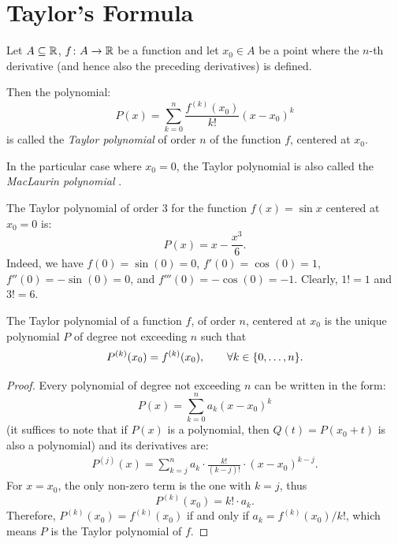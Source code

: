 \section{Taylor's Formula}

\begin{definition}
\mymark{***}
Let $A\subseteq {\mathbb R}$, $f\colon A \to {\mathbb R}$ be a function
and let $x_0\in A$ be a point where the $n$-th derivative
(and hence also the preceding derivatives) is defined.

Then the polynomial:
\[
  P(x) = \sum_{k=0}^n \frac{f^{(k)}(x_0)}{k!}(x-x_0)^k
\]
is called the \emph{Taylor polynomial}%
%
of order $n$
of the function $f$,
centered at $x_0$.
\end{definition}

In the particular case where $x_0=0$, the Taylor polynomial is also called the
\emph{MacLaurin polynomial}%
%
.

\begin{example}
  The Taylor polynomial of order $3$ for the function $f(x) = \sin x$ 
  centered at $x_0=0$ is:
  \[
    P(x) = x - \frac{x^3}{6}.
  \]
  Indeed, we have $f(0) = \sin(0) = 0$, $f'(0) = \cos(0) = 1$, 
  $f''(0) = -\sin(0) = 0$, and $f'''(0) = -\cos(0) = -1$.
  Clearly, $1!=1$ and $3!=6$. 
\end{example}

\begin{theorem}%
\label{th:caratterizzazioneTaylor}%
\mymark{***}%
The Taylor polynomial of a function $f$, of order $n$, centered at $x_0$ is the
unique polynomial $P$ of degree not exceeding $n$ such that
\[
  P^{(k)}(x_0) = f^{(k)}(x_0), \qquad \forall k \in {\left\{ 0,\dots,n \right\}}.
\]
\end{theorem}
%
\begin{proof}
  Every polynomial of degree not exceeding $n$ can be written in the form:
\[
  P(x) = \sum_{k=0}^{n} a_k (x-x_0)^k
\]
(it suffices to note that if $P(x)$ is a polynomial, then $Q(t) = P(x_0+t)$ is
also a polynomial)
and its derivatives are:
\begin{align*}
   P^{(j)}(x)
   = \sum_{k=j}^n a_k \cdot \frac{k!}{(k-j)!}\cdot (x-x_0)^{k-j}.
\end{align*}
For $x=x_0$, the only non-zero term is the one with $k=j$, thus
\[
  P^{(k)}(x_0) = k! \cdot a_k.
\]
Therefore, $P^{(k)}(x_0) = f^{(k)}(x_0)$ if and only if $a_k = f^{(k)}(x_0)/k!$,
which means $P$ is the Taylor polynomial of $f$.
\end{proof}

